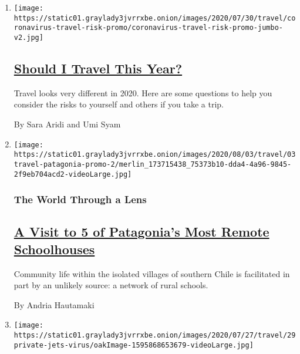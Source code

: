 \begin{enumerate}
\def\labelenumi{\arabic{enumi}.}
\item
  \texttt{[image: https://static01.graylady3jvrrxbe.onion/images/2020/07/30/travel/coronavirus-travel-risk-promo/coronavirus-travel-risk-promo-jumbo-v2.jpg]}

  \hypertarget{should-i-travel-this-year}{%
  \subsection{\texorpdfstring{\href{/interactive/2020/07/31/travel/coronavirus-travel-risk.html}{Should
  I Travel This
  Year?}}{Should I Travel This Year?}}\label{should-i-travel-this-year}}

  Travel looks very different in 2020. Here are some questions to help
  you consider the risks to yourself and others if you take a trip.

  By Sara Aridi and Umi Syam
\item
  \texttt{[image: https://static01.graylady3jvrrxbe.onion/images/2020/08/03/travel/03travel-patagonia-promo-2/merlin\_173715438\_75373b10-dda4-4a96-9845-2f9eb704acd2-videoLarge.jpg]}

  \hypertarget{the-world-through-a-lens}{%
  \subsubsection{The World Through a
  Lens}\label{the-world-through-a-lens}}

  \hypertarget{a-visit-to-5-of-patagonias-most-remote-schoolhouses}{%
  \subsection{\texorpdfstring{\href{/2020/08/03/travel/remote-schools-patagonia.html}{A
  Visit to 5 of Patagonia's Most Remote
  Schoolhouses}}{A Visit to 5 of Patagonia's Most Remote Schoolhouses}}\label{a-visit-to-5-of-patagonias-most-remote-schoolhouses}}

  Community life within the isolated villages of southern Chile is
  facilitated in part by an unlikely source: a network of rural schools.

  By Andria Hautamaki
\item
  \texttt{[image: https://static01.graylady3jvrrxbe.onion/images/2020/07/27/travel/29private-jets-virus/oakImage-1595868653679-videoLarge.jpg]}

  \hypertarget{afraid-of-airlines-theres-always-the-private-jet}{%
}
\end{enumerate}

